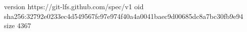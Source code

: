 version https://git-lfs.github.com/spec/v1
oid sha256:32792e0233ec4d549567fc97e974f40a4a0041baec9d00685dc8a7bc30fb9e94
size 4367
